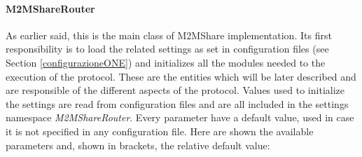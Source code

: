 \paragraph{M2MShareRouter}
As earlier said, this is the main class of M2MShare implementation. Its first responsibility is to load the related settings as set in configuration files (see Section \ref{configurazioneONE}) and initializes all the modules needed to the execution of the protocol. These are the entities which will be later described and are responsible of the different aspects of the protocol. Values used to initialize the settings are read from configuration files and are all included in the settings namespace \textit{M2MShareRouter}. Every parameter have a default value, used in case it is not specified in any configuration file. Here are shown the available parameters and, shown in brackets, the relative default value:
